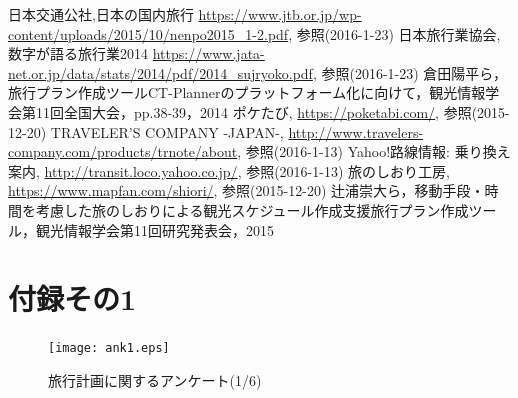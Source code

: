\documentclass{funthesis}
\begin{document}
\begin{thebibliography}{9}
日本交通公社,日本の国内旅行  {\url{https://www.jtb.or.jp/wp-content/uploads/2015/10/nenpo2015_1-2.pdf}}, 参照(2016-1-23)
日本旅行業協会,数字が語る旅行業2014  {\url{https://www.jata-net.or.jp/data/stats/2014/pdf/2014_sujryoko.pdf}}, 参照(2016-1-23)
  倉田陽平ら，旅行プラン作成ツールCT-Plannerのプラットフォーム化に向けて，観光情報学会第11回全国大会，pp.38-39，2014
ポケたび,  {\url{https://poketabi.com/}}, 参照(2015-12-20)
TRAVELER'S COMPANY -JAPAN-,  {\url{http://www.travelers-company.com/products/trnote/about}}, 参照(2016-1-13)
Yahoo!路線情報: 乗り換え案内,  {\url{http://transit.loco.yahoo.co.jp/}}, 参照(2016-1-13)
旅のしおり工房,  {\url{https://www.mapfan.com/shiori/}}, 参照(2015-12-20)
 辻浦崇大ら，移動手段・時間を考慮した旅のしおりによる観光スケジュール作成支援旅行プラン作成ツール，観光情報学会第11回研究発表会，2015

\end{thebibliography}


\appendix



\chapter*{付録その1}

\begin{figure}[htpb]
\begin{center}
\texttt{[image: ank1.eps]}
\caption{旅行計画に関するアンケート(1/6)}
\end{center}
\end{figure}
\end{document}
